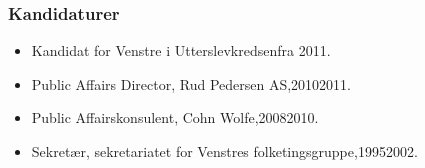\documentclass[11pt, a4paper]{awesome-cv}
\begin{document}
\begin{cvletter}
\subsubsection*{Kandidaturer}
\begin{itemize}
\item Kandidat for Venstre i Utterslevkredsenfra 2011.
\end{itemize}
\begin{itemize}
\item Public Affairs Director, Rud Pedersen AS,20102011.
\item Public Affairskonsulent, Cohn  Wolfe,20082010.
\item Sekretær, sekretariatet for Venstres folketingsgruppe,19952002.
\end{itemize}
\end{cvletter}
\end{document}
